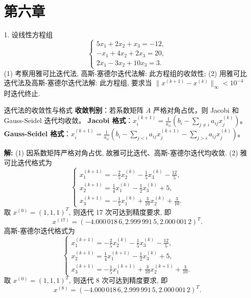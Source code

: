 \documentclass[a4paper,11pt]{ctexart}
\begin{document}
\newpage

\section{第六章}

1. 设线性方程组
\[
\begin{cases}
5x_1 + 2x_2 + x_3 = -12, \\
-x_1 + 4x_2 + 2x_3 = 20, \\
2x_1 - 3x_2 + 10x_3 = 3.
\end{cases}
\]
(1) 考察用雅可比迭代法, 高斯-塞德尔迭代法解: 此方程组的收敛性;
(2) 用雅可比迭代法及高斯-塞德尔迭代法解: 此方程组, 要求当 $\|x^{(k+1)} - x^{(k)}\|_\infty < 10^{-4}$ 时迭代终止.

\begin{theorybox}{迭代法的收敛性与格式}
\textbf{收敛判别}：若系数矩阵 $A$ 严格对角占优，则 Jacobi 和 Gauss-Seidel 迭代均收敛。
\textbf{Jacobi 格式}：$x_i^{(k+1)} = \frac{1}{a_{ii}}(b_i - \sum_{j \neq i} a_{ij}x_j^{(k)})$。
\textbf{Gauss-Seidel 格式}：$x_i^{(k+1)} = \frac{1}{a_{ii}}(b_i - \sum_{j<i} a_{ij}x_j^{(k+1)} - \sum_{j>i} a_{ij}x_j^{(k)})$。
\end{theorybox}

\textbf{解: } (1) 因系数矩阵严格对角占优, 故雅可比迭代、高斯-塞德尔迭代均收敛.
(2) 雅可比迭代格式为
\[
\begin{cases}
x_1^{(k+1)} = -\frac{2}{5}x_2^{(k)} - \frac{1}{5}x_3^{(k)} - \frac{12}{5}, \\
x_2^{(k+1)} = \frac{1}{4}x_1^{(k)} - \frac{1}{2}x_3^{(k)} + 5, \\
x_3^{(k+1)} = -\frac{1}{5}x_1^{(k)} + \frac{3}{10}x_2^{(k)} + \frac{3}{10}.
\end{cases}
\]
取 $x^{(0)} = (1, 1, 1)^T$, 则迭代 17 次可达到精度要求, 即
\[
x^{(17)} = (-4.000\,018\,6, 2.999\,991\,5, 2.000\,001\,2)^T.
\]
高斯-塞德尔迭代格式为
\[
\begin{cases}
x_1^{(k+1)} = -\frac{2}{5}x_2^{(k)} - \frac{1}{5}x_3^{(k)} - \frac{12}{5}, \\
x_2^{(k+1)} = \frac{1}{4}x_1^{(k+1)} - \frac{1}{2}x_3^{(k)} + 5, \\
x_3^{(k+1)} = -\frac{1}{5}x_1^{(k+1)} + \frac{3}{10}x_2^{(k+1)} + \frac{3}{10}.
\end{cases}
\]
取 $x^{(0)} = (1, 1, 1)^T$, 则迭代 8 次可达到精度要求, 即
\[
x^{(8)} = (-4.000\,018\,6, 2.999\,991\,5, 2.000\,001\,2)^T.
\]

\vspace{2em}
\end{document}
